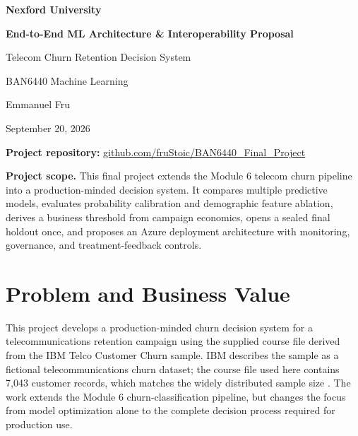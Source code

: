 \documentclass[11pt]{article}
\begin{document}

\begin{titlepage}
\centering
\vspace*{1.0in}
{\Large\bfseries Nexford University\par}
\vspace{0.45in}
{\LARGE\bfseries End-to-End ML Architecture \& Interoperability Proposal\par}
\vspace{0.15in}
{\Large Telecom Churn Retention Decision System\par}
\vspace{0.7in}
{\large BAN6440 Machine Learning\par}
\vspace{0.5in}
{\large Emmanuel Fru\par}
\vfill
{\large September 20, 2026\par}
\vspace{0.18in}
{\small\textbf{Project repository:} \href{https://github.com/fruStoic/BAN6440_Final_Project}{github.com/fruStoic/BAN6440\_Final\_Project}\par}
\vspace{0.3in}
\begin{minipage}{0.84\textwidth}
\small
\textbf{Project scope.} This final project extends the Module 6 telecom churn pipeline into a production-minded decision system. It compares multiple predictive models, evaluates probability calibration and demographic feature ablation, derives a business threshold from campaign economics, opens a sealed final holdout once, and proposes an Azure deployment architecture with monitoring, governance, and treatment-feedback controls.
\end{minipage}
\vfill
\end{titlepage}
\clearpage
{}

\section{Problem and Business Value}

This project develops a production-minded churn decision system for a telecommunications retention campaign using the supplied course file derived from the IBM Telco Customer Churn sample. IBM describes the sample as a fictional telecommunications churn dataset; the course file used here contains 7,043 customer records, which matches the widely distributed sample size \citep{ibm2019}. The work extends the Module 6 churn-classification pipeline, but changes the focus from model optimization alone to the complete decision process required for production use.
\end{document}
